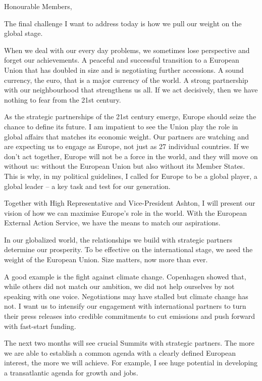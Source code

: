 \documentclass[a4paper,11pt]{article}
\begin{document}
Honourable Members,

The final challenge I want to address today is how we pull our weight on the global stage.

When we deal with our every day problems, we sometimes lose perspective and forget our achievements. A peaceful and successful transition to a European Union that has doubled in size and is negotiating further accessions. A sound currency, the euro, that is a major currency of the world. A strong partnership with our neighbourhood that strengthens us all. If we act decisively, then we have nothing to fear from the 21st century.

As the strategic partnerships of the 21st century emerge, Europe should seize the chance to define its future. I am impatient to see the Union play the role in global affairs that matches its economic weight. Our partners are watching and are expecting us to engage as Europe, not just as 27 individual countries. If we don't act together, Europe will not be a force in the world, and they will move on without us: without the European Union but also without its Member States. This is why, in my political guidelines, I called for Europe to be a global player, a global leader – a key task and test for our generation.

Together with High Representative and Vice-President Ashton, I will present our vision of how we can maximise Europe's role in the world. With the European External Action Service, we have the means to match our aspirations.

In our globalized world, the relationships we build with strategic partners determine our prosperity. To be effective on the international stage, we need the weight of the European Union. Size matters, now more than ever.

A good example is the fight against climate change. Copenhagen showed that, while others did not match our ambition, we did not help ourselves by not speaking with one voice. Negotiations may have stalled but climate change has not. I want us to intensify our engagement with international partners to turn their press releases into credible commitments to cut emissions and push forward with fast-start funding.

The next two months will see crucial Summits with strategic partners. The more we are able to establish a common agenda with a clearly defined European interest, the more we will achieve. For example, I see huge potential in developing a transatlantic agenda for growth and jobs.
\end{document}
